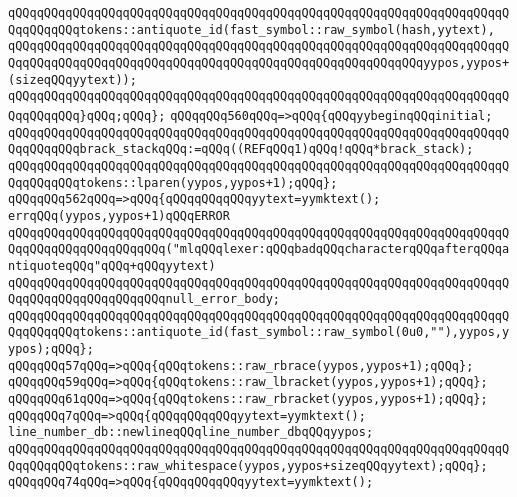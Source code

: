 \verb|qQQqqQQqqQQqqQQqqQQqqQQqqQQqqQQqqQQqqQQqqQQqqQQqqQQqqQQqqQQqqQQqqQQqqQQqqQQqqQQqtokens::antiquote_id(fast_symbol::raw_symbol(hash,yytext),|\newline
\verb|qQQqqQQqqQQqqQQqqQQqqQQqqQQqqQQqqQQqqQQqqQQqqQQqqQQqqQQqqQQqqQQqqQQqqQQqqQQqqQQqqQQqqQQqqQQqqQQqqQQqqQQqqQQqqQQqqQQqqQQqqQQqqQQqyypos,yypos+(sizeqQQqyytext));|\newline
\verb|qQQqqQQqqQQqqQQqqQQqqQQqqQQqqQQqqQQqqQQqqQQqqQQqqQQqqQQqqQQqqQQqqQQqqQQqqQQqqQQq}qQQq;qQQq};|\newline
\verb|qQQqqQQq560qQQq=>qQQq{qQQqyybeginqQQqinitial;|\newline
\verb|qQQqqQQqqQQqqQQqqQQqqQQqqQQqqQQqqQQqqQQqqQQqqQQqqQQqqQQqqQQqqQQqqQQqqQQqqQQqqQQqbrack_stackqQQq:=qQQq((REFqQQq1)qQQq!qQQq*brack_stack);|\newline
\verb|qQQqqQQqqQQqqQQqqQQqqQQqqQQqqQQqqQQqqQQqqQQqqQQqqQQqqQQqqQQqqQQqqQQqqQQqqQQqqQQqtokens::lparen(yypos,yypos+1);qQQq};|\newline
\verb|qQQqqQQq562qQQq=>qQQq{qQQqqQQqqQQqyytext=yymktext();|\newline
\verb|errqQQq(yypos,yypos+1)qQQqERROR|\newline
\verb|qQQqqQQqqQQqqQQqqQQqqQQqqQQqqQQqqQQqqQQqqQQqqQQqqQQqqQQqqQQqqQQqqQQqqQQqqQQqqQQqqQQqqQQqqQQq("mlqQQqlexer:qQQqbadqQQqcharacterqQQqafterqQQqantiquoteqQQq"qQQq+qQQqyytext)|\newline
\verb|qQQqqQQqqQQqqQQqqQQqqQQqqQQqqQQqqQQqqQQqqQQqqQQqqQQqqQQqqQQqqQQqqQQqqQQqqQQqqQQqqQQqqQQqqQQqnull_error_body;|\newline
\verb|qQQqqQQqqQQqqQQqqQQqqQQqqQQqqQQqqQQqqQQqqQQqqQQqqQQqqQQqqQQqqQQqqQQqqQQqqQQqqQQqtokens::antiquote_id(fast_symbol::raw_symbol(0u0,""),yypos,yypos);qQQq};|\newline
\verb|qQQqqQQq57qQQq=>qQQq{qQQqtokens::raw_rbrace(yypos,yypos+1);qQQq};|\newline
\verb|qQQqqQQq59qQQq=>qQQq{qQQqtokens::raw_lbracket(yypos,yypos+1);qQQq};|\newline
\verb|qQQqqQQq61qQQq=>qQQq{qQQqtokens::raw_rbracket(yypos,yypos+1);qQQq};|\newline
\verb|qQQqqQQq7qQQq=>qQQq{qQQqqQQqqQQqyytext=yymktext();|\newline
\verb|line_number_db::newlineqQQqline_number_dbqQQqyypos;|\newline
\verb|qQQqqQQqqQQqqQQqqQQqqQQqqQQqqQQqqQQqqQQqqQQqqQQqqQQqqQQqqQQqqQQqqQQqqQQqqQQqqQQqtokens::raw_whitespace(yypos,yypos+sizeqQQqyytext);qQQq};|\newline
\verb|qQQqqQQq74qQQq=>qQQq{qQQqqQQqqQQqyytext=yymktext();|\newline
